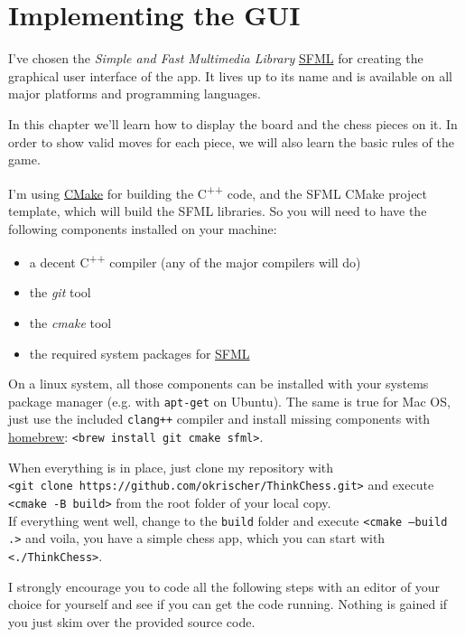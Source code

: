 \chapter{Implementing the GUI}

I've chosen the \emph{Simple and Fast Multimedia Library}
\href{https://www.sfml-dev.org/index.php}{SFML} for creating the graphical user interface
of the app.
It lives up to its name and is available on all major platforms and programming languages.

In this chapter we'll learn how to display the board and the chess pieces on it.
In order to show valid moves for each piece, we will also learn the basic rules of the game.

I'm using \href{https://cmake.org/}{CMake} for building the C\textsuperscript{++} code,
and the SFML CMake project template, which will build the SFML libraries.
So you will need to have the following components installed on your machine:

\begin{itemize}
  \item a decent C\textsuperscript{++} compiler (any of the major compilers will do)
  \item the \emph{git} tool
  \item the \emph{cmake} tool
  \item the required system packages for
    \href{https://www.sfml-dev.org/tutorials/2.6/start-cmake.php}{SFML}
\end{itemize}
 
On a linux system, all those components can be installed with your systems package manager
(e.g. with \texttt{apt-get} on Ubuntu).
The same is true for Mac OS, just use the included \texttt{clang++} compiler and install
missing components with \href{https://brew.sh/}{homebrew}:
\texttt{<brew install git cmake sfml>}.

When everything is in place, just clone my repository with\\
\texttt{<git clone https://github.com/okrischer/ThinkChess.git>} and execute\\
\texttt{<cmake -B build>} from the root folder of your local copy.\\
If everything went well, change to the \texttt{build} folder and execute
\texttt{<cmake --build .>} and voila, you have a simple chess app, which you can start with
\texttt{<./ThinkChess>}.

I strongly encourage you to code all the following steps with an editor of your choice
for yourself and see if you can get the code running. Nothing is gained if you just skim
over the provided source code.

